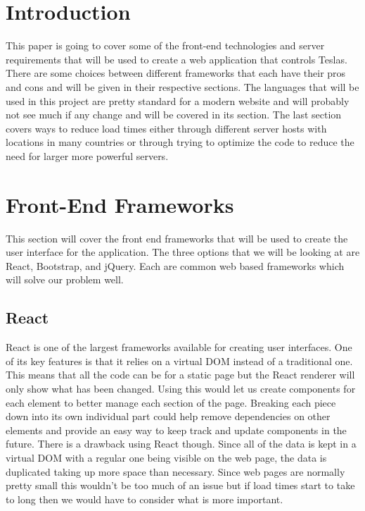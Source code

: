 \documentclass[onecolumn, draftclsnofoot,10pt, compsoc]{IEEEtran}
\begin{document}
\section{Introduction}
This paper is going to cover some of the front-end technologies and server requirements that will be used to create a web application that controls Teslas.
There are some choices between different frameworks that each have their pros and cons and will be given in their respective sections. 
The languages that will be used in this project are pretty standard for a modern website and will probably not see much if any change and will be covered in its section. 
The last section covers ways to reduce load times either through different server hosts with locations in many countries or through trying to optimize the code to reduce the need for larger more powerful servers.

\section{Front-End Frameworks}
This section will cover the front end frameworks that will be used to create the user interface for the application.
The three options that we will be looking at are React, Bootstrap, and jQuery.
Each are common web based frameworks which will solve our problem well.
\subsection{React}
React is one of the largest frameworks available for creating user interfaces. \cite{1}
One of its key features is that it relies on a virtual DOM instead of a traditional one. \cite{1} 
This means that all the code can be for a static page but the React renderer will only show what has been changed.
Using this would let us create components for each element to better manage each section of the page.
Breaking each piece down into its own individual part could help remove dependencies on other elements and provide an easy way to keep track and update components in the future.
There is a drawback using React though.
Since all of the data is kept in a virtual DOM with a regular one being visible on the web page, the data is duplicated taking up more space than necessary. \cite{2}
Since web pages are normally pretty small this wouldn't be too much of an issue but if load times start to take to long then we would have to consider what is more important.
\end{document}

